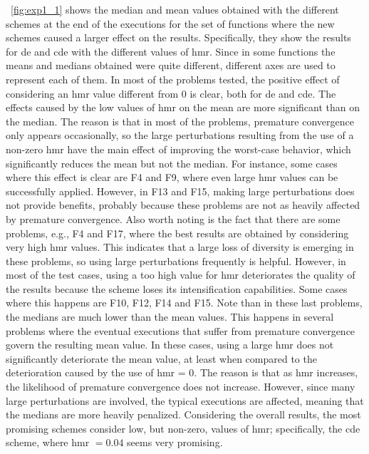 \documentclass[preprint,3p]{elsarticle}
\newcommand{\CDE}{c{\sc de}}
\newcommand{\DE}{{\sc de}}
\newcommand{\HMR}{{\sc hmr}}
\begin{document}
\figurename~\ref{fig:exp1_1} shows the median and mean values obtained with the different schemes at the end of the executions for the set of functions
where the new schemes caused a larger effect on the results.
%
Specifically, they show the results for \DE{} and \CDE{} with the different values of \HMR{}.
%
Since in some functions the means and medians obtained were quite different, different axes are used
to represent each of them.
%
In most of the problems tested, the positive effect of considering
an \HMR{} value different from 0 is clear, both for \DE{} and \CDE{}.
%
The effects caused by the low values of \HMR{} on the mean are more significant than on the median.
%
The reason is that in most of the problems, premature convergence only appears occasionally, so the large perturbations resulting from
the use of a non-zero \HMR{} have the main effect of improving the worst-case behavior, which significantly reduces the mean but not the median.
%
For instance, some cases where this effect is clear are F4 and F9, where even large \HMR{} values can be successfully applied.
%
However, in F13 and F15, making large perturbations does not provide benefits, probably because these problems are not as heavily affected by premature convergence.
%
Also worth noting is the fact that there are some problems, e.g., F4 and F17, where the best results are obtained by considering very high \HMR{}
values.
%
This indicates that a large loss of diversity is emerging in these problems, so using large perturbations frequently is helpful.
%
However, in most of the test cases, using a too high value for \HMR{} deteriorates the quality of the results
because the scheme loses its intensification capabilities.
%
Some cases where this happens are F10, F12, F14 and F15.
%
Note than in these last problems, the medians are much lower than the mean values.
%
This happens in several problems where the eventual executions that suffer from premature convergence govern the resulting mean value.
%
In these cases, using a large \HMR{} does not significantly deteriorate the mean value, at least when compared to the deterioration
caused by the use of \HMR{} = 0.
%
The reason is that as \HMR{} increases, the likelihood of premature convergence does not increase.
%
However, since many large perturbations are involved, the typical executions are affected, meaning that the medians are more heavily penalized.
%
Considering the overall results, the most promising schemes consider low, but non-zero, values of \HMR{}; specifically, the \CDE{} scheme, where \HMR{} $ = 0.04$ seems very promising.
\end{document}
